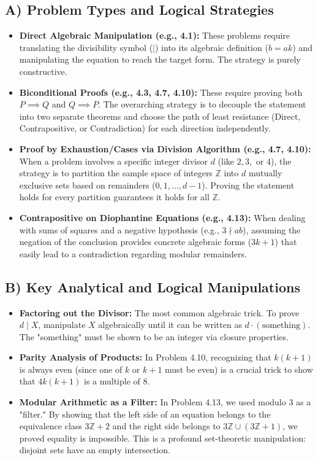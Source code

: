 \documentclass[11pt]{article}
\theoremstyle{definition}
\theoremstyle{remark}
\newcommand{\Z}{\mathbb{Z}}
\begin{document}
\subsection{A) Problem Types and Logical Strategies}
\begin{itemize}
    \item \textbf{Direct Algebraic Manipulation (e.g., 4.1):} These problems require translating the divisibility symbol ($\mid$) into its algebraic definition ($b = ak$) and manipulating the equation to reach the target form. The strategy is purely constructive.
    \item \textbf{Biconditional Proofs (e.g., 4.3, 4.7, 4.10):} These require proving both $P \implies Q$ and $Q \implies P$. The overarching strategy is to decouple the statement into two separate theorems and choose the path of least resistance (Direct, Contrapositive, or Contradiction) for each direction independently.
    \item \textbf{Proof by Exhaustion/Cases via Division Algorithm (e.g., 4.7, 4.10):} When a problem involves a specific integer divisor $d$ (like $2, 3,$ or $4$), the strategy is to partition the sample space of integers $\Z$ into $d$ mutually exclusive sets based on remainders ($0, 1, \dots, d-1$). Proving the statement holds for every partition guarantees it holds for all $\Z$.
    \item \textbf{Contrapositive on Diophantine Equations (e.g., 4.13):} When dealing with sums of squares and a negative hypothesis (e.g., $3 \nmid ab$), assuming the negation of the conclusion provides concrete algebraic forms ($3k+1$) that easily lead to a contradiction regarding modular remainders.
\end{itemize}

\subsection{B) Key Analytical and Logical Manipulations}
\begin{itemize}
    \item \textbf{Factoring out the Divisor:} The most common algebraic trick. To prove $d \mid X$, manipulate $X$ algebraically until it can be written as $d \cdot (\text{something})$. The "something" must be shown to be an integer via closure properties.
    \item \textbf{Parity Analysis of Products:} In Problem 4.10, recognizing that $k(k+1)$ is always even (since one of $k$ or $k+1$ must be even) is a crucial trick to show that $4k(k+1)$ is a multiple of $8$.
    \item \textbf{Modular Arithmetic as a Filter:} In Problem 4.13, we used modulo $3$ as a "filter." By showing that the left side of an equation belongs to the equivalence class $3\Z + 2$ and the right side belongs to $3\Z \cup (3\Z + 1)$, we proved equality is impossible. This is a profound set-theoretic manipulation: disjoint sets have an empty intersection.
\end{itemize}
\end{document}
